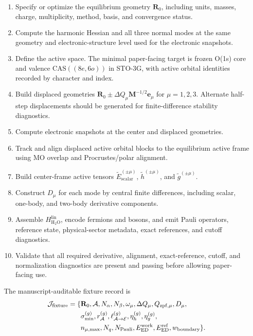 \documentclass[
  reprint,
  amsmath,
  amssymb,
  aps,
  pra,
  nofootinbib,
  superscriptaddress,
  floatfix
]{revtex4-2}
\newcommand{\Acal}{\mathcal{A}}
\newcommand{\Ecal}{\mathcal{E}}
\newcommand{\ed}{\mathrm{ED}}
\newcommand{\CAS}{\mathrm{CAS}}
\newcommand{\HtwoO}{\mathrm{H_2O}}
\newcommand{\lin}{\mathrm{lin}}
\newcommand{\work}{\mathrm{work}}
\newcommand{\refc}{\mathrm{ref}}
\newcommand{\scalar}{\mathrm{scalar}}
\newcommand{\zpf}{\mathrm{zpf}}
\begin{document}
\begin{enumerate}
\item Specify or optimize the equilibrium geometry \(\mathbf R_0\), including units, masses, charge, multiplicity, method, basis, and convergence status.
\item Compute the harmonic Hessian and all three normal modes at the same geometry and electronic-structure level used for the electronic snapshots.
\item Define the active space.  The minimal paper-facing target is frozen O(1s) core and valence \(\CAS((8e,6o))\) in STO-3G, with active orbital identities recorded by character and index.
\item Build displaced geometries \(\mathbf R_0\pm\Delta Q_\mu \mathbf M^{-1/2}\mathbf e_\mu\) for \(\mu=1,2,3\).  Alternate half-step displacements should be generated for finite-difference stability diagnostics.
\item Compute electronic snapshots at the center and displaced geometries.
\item Track and align displaced active orbital blocks to the equilibrium active frame using MO overlap and Procrustes/polar alignment.
\item Build center-frame active tensors \(\widetilde E_{\scalar}^{(\pm\mu)}\), \(\widetilde h^{(\pm\mu)}\), and \(\widetilde g^{(\pm\mu)}\).
\item Construct \(D_\mu\) for each mode by central finite differences, including scalar, one-body, and two-body derivative components.
\item Assemble \(H_{\HtwoO}^{\lin}\), encode fermions and bosons, and emit Pauli operators, reference state, physical-sector metadata, exact references, and cutoff diagnostics.
\item Validate that all required derivative, alignment, exact-reference, cutoff, and normalization diagnostics are present and passing before allowing paper-facing use.
\end{enumerate}

The manuscript-auditable fixture record is
\begin{align}
\mathcal J_{\rm fixture}
=
\{&
\mathbf R_0,\Acal,N_\alpha,N_\beta,
\omega_\mu,\Delta Q_\mu,Q_{\zpf,\mu},
D_\mu,
\nonumber\\
&
\sigma_{\min}^{(g)},r_{\Acal}^{(g)},\ell_{\Acal\to\Ecal}^{(g)},
\eta_h^{(g)},\eta_g^{(g)},
\nonumber\\
&
n_{\mu,\max},N_q,N_{\rm Pauli},
E_{\ed}^{\work},E_{\ed}^{\refc},w_{\rm boundary}
\}.
\label{eq:fixture_record}
\end{align}
\end{document}
